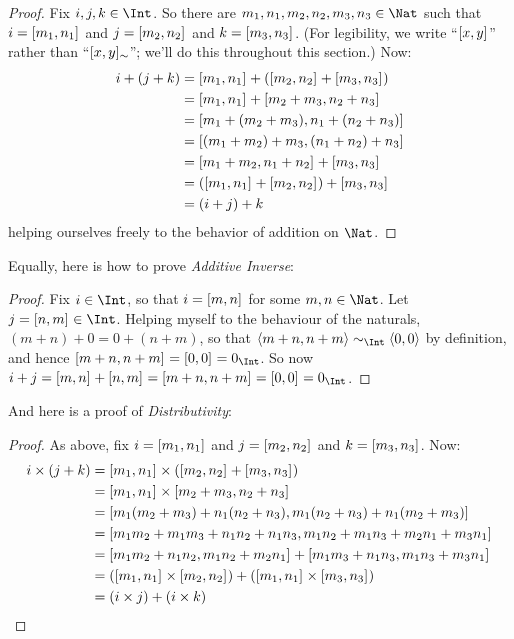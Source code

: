 \documentclass[../../../include/open-logic-section]{subfiles}
\begin{document}
\begin{proof} 
Fix $i, j, k \in \Int$. So there are $m_1, n_1, m_2, n_2, m_3, n_3 \in
\Nat$ such that $i = [m_1, n_1]_{}$ and $j =
[m_2,n_2]_{}$ and $k = [m_3, n_3]_{}$. (For
legibility, we write ``$[x, y]_{}$'' rather than
``$[x, y]_{\sim}$''; we'll do this throughout this
section.) Now:
\begin{align*}
	i + (j + k) &= \equivrep{m_1, n_1}{}+(\equivrep{m_2, n_2}{} + \equivrep{m_3, n_3}{}) \\
	&= \equivrep{m_1,  n_1}{} + \equivrep{m_2+m_3, n_2+n_3}{}\\
	&= \equivrep{m_1 + (m_2 + m_3), n_1 + (n_2 + n_3)}{}\\
	&= \equivrep{(m_1 + m_2) + m_3, (n_1 + n_2) + n_3}{}\\
	&= \equivrep{m_1 + m_2, n_1 + n_2}{} + \equivrep{m_3, n_3}{}\\
	&= (\equivrep{m_1, n_1}{} + \equivrep{m_2, n_2}{}) + \equivrep{m_3, n_3}{}\\
	&= (i+j) + k
\end{align*}
helping ourselves freely to the behavior of addition on $\Nat$.
\end{proof}

Equally, here is how to prove \emph{Additive Inverse}:

\begin{proof}
Fix $i \in \Int$, so that $i = [m,n]_{}$ for some $m, n \in
\Nat$. Let $j = \equivrep{n, m}{} \in \Int$. Helping myself to the
behaviour of the naturals, $(m+n) + 0 = 0 + (n+m)$, so that
$\tuple{m+n, n+m} \sim_\Int \tuple{0,0}$ by definition, and hence
$\equivrep{m+n, n+m}{} = \equivrep{0, 0}{} = 0_\Int$. So now $i + j =
\equivrep{m,n}{}+\equivrep{n,m}{}=\equivrep{m+n, n+m}{}= \equivrep{0,
0}{} = 0_\Int$.
\end{proof}

And here is a proof of \emph{Distributivity}:

\begin{proof}
As above, fix $i = [m_1, n_1]_{}$ and $j =
[m_2,n_2]_{}$ and $k = [m_3, n_3]_{}$. Now:
\begin{align*}
	i \times (j + k) 
	&= \equivrep{m_1, n_1}{} \times (\equivrep{m_2,n_2}{} + \equivrep{m_3, n_3}{})\\
	&= \equivrep{m_1, n_1}{} \times \equivrep{m_2 + m_3,n_2+n_3}{}\\
	&= \equivrep{m_1  (m_2 + m_3) + n_1  (n_2+n_3), m_1  (n_2 + n_3) + n_1 (m_2 + m_3)}{}\\
	&= \equivrep{m_1 m_2 + m_1m_3 + n_1 n_2+n_1n_3, m_1 n_2 + m_1n_3 + m_2n_1 + m_3n_1}{}\\		
	&= \equivrep{m_1m_2 + n_1n_2, m_1n_2 + m_2n_1}{} + \equivrep{m_1m_3 + n_1n_3, m_1n_3 + m_3n_1}{}\\
	&= (\equivrep{m_1, n_1}{} \times \equivrep{m_2,n_2}{}) + (\equivrep{m_1, n_1}{} \times  \equivrep{m_3, n_3}{})\\
	&= (i \times j) + (i \times k)
\end{align*}
\end{proof}
\end{document}
